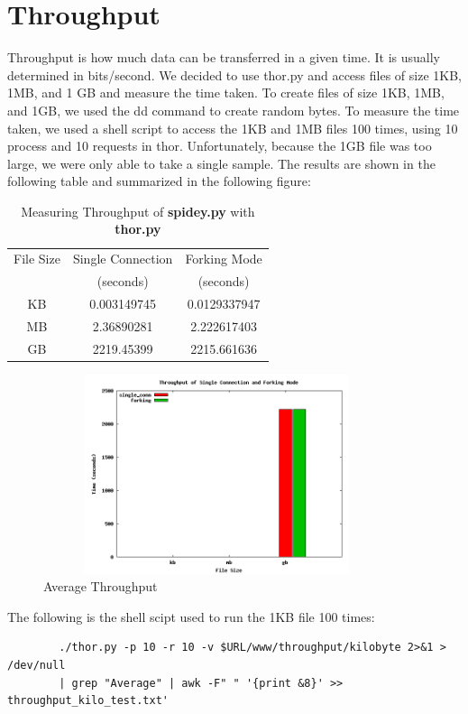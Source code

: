 \documentclass{article}
\begin{document}
\section*{Throughput}
Throughput is how much data can be transferred in a given time. It is usually determined in bits/second. We decided to use thor.py and access files of size 1KB, 1MB, and 1 GB and measure the time taken. To create files of size 1KB, 1MB, and 1GB, we used the dd command to create random bytes. To measure the time taken, we used a shell script to access the 1KB and 1MB files 100 times, using 10 process and 10 requests in thor. Unfortunately, because the 1GB file was too large, we were only able to take a single sample. The results are shown in the following table and summarized in the following figure:
\begin{table}[H]
    \centering
    \begin{tabular}{|c||c|c|}
        \hline
        File Size & Single Connection  & Forking Mode  \\
        & (seconds) & (seconds) \\
        \hline
        \hline
         KB & 0.003149745 & 0.0129337947 \\
         MB & 2.36890281 & 2.222617403 \\
         GB & 2219.45399 & 2215.661636 \\
         \hline
    \end{tabular}
    \caption{Measuring Throughput of \textbf{spidey.py} with \textbf{thor.py}}
    \label{tab:my_label}
\end{table}
\begin{figure}[H]
    \centering
    \includegraphics[width=4in, height=2.3in]{throughput.png}
    \caption{Average Throughput}
    \label{fig:my_label}
\end{figure}
\noindent The following is the shell scipt used to run the 1KB file 100 times:
\begin{verbatim}
        ./thor.py -p 10 -r 10 -v $URL/www/throughput/kilobyte 2>&1 > /dev/null 
        | grep "Average" | awk -F" " '{print &8}' >> throughput_kilo_test.txt' 
\end{verbatim}
\end{document}
